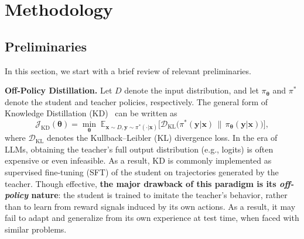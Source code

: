 \documentclass{article} %
\begin{document}
\section{Methodology}
\subsection{Preliminaries}
In this section, we start with a brief review of relevant preliminaries.

\textbf{Off-Policy Distillation.} 
Let $D$ denote the input distribution, and let $\pi_{\boldsymbol{\theta}}$ and $\pi^{*}$ denote the student and teacher policies, respectively. The general form of Knowledge Distillation (KD)~\citep{kd} can be written as
\begin{equation}
\label{eq:kd}
\mathcal{J}_{\text{KD}}(\boldsymbol{\theta}) =  \min_{\boldsymbol{\theta}}\;
\mathbb{E}_{\boldsymbol{x} \sim D , \boldsymbol{y} \sim \pi^{*}(\cdot | \boldsymbol{x}) }\Big[
\mathcal{D}_{\mathrm{KL}} \!\big(
\pi^{*}(\boldsymbol{y} | \boldsymbol{x})
\,\big\|\,
\pi_{\boldsymbol{\theta}}( \boldsymbol{y} | \boldsymbol{x})
\big)
\Big],
\end{equation}
where $\mathcal{D}_{\mathrm{KL}}$ denotes the Kullback--Leibler (KL) divergence loss. 
In the era of LLMs, obtaining the teacher's full output distribution (e.g., logits) is often expensive or even infeasible. As a result, KD is commonly implemented as supervised fine-tuning (SFT) of the student on trajectories generated by the teacher. Though effective, \textbf{the major drawback of this paradigm is its \textit{off-policy} nature}: the student is trained to imitate the teacher's behavior, rather than to learn from reward signals induced by its own actions. As a result, it may fail to adapt and generalize from its own experience at test time, when faced with similar problems.
\end{document}
